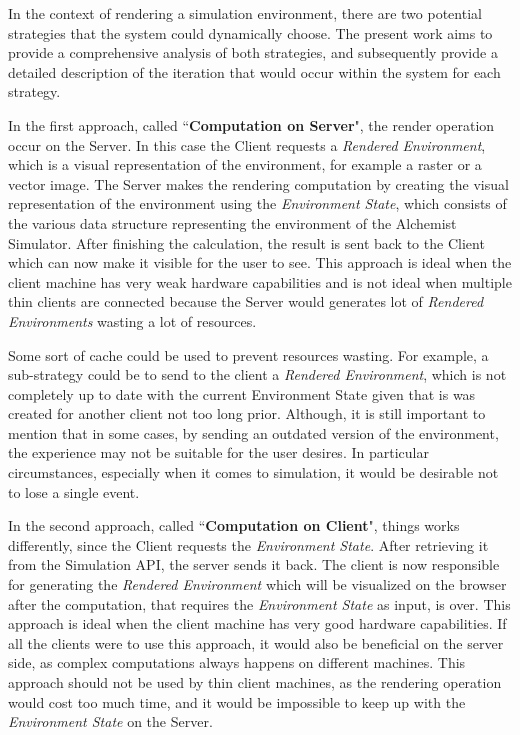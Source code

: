 In the context of rendering a simulation environment, there are two potential strategies that the system could dynamically choose. The present work aims to provide a comprehensive analysis of both strategies, and subsequently provide a detailed description of the iteration that would occur within the system for each strategy.\newline


In the first approach, called ``\textbf{Computation on Server}", the render operation occur on the Server. In this case the Client requests a \textit{Rendered Environment}, which is a visual representation of the environment, for example a raster or a vector image. The Server makes the rendering computation by creating the visual representation of the environment using the \textit{Environment State}, which consists of the various data structure representing the environment of the Alchemist Simulator.
After finishing the calculation, the result is sent back to the Client which can now make it visible for the user to see. This approach is ideal when the client machine has very weak hardware capabilities and is not ideal when multiple thin clients are connected because the Server would generates lot of \textit{Rendered Environments} wasting a lot of resources.

\begin{warn}[Note:]
	Some sort of cache could be used to prevent resources wasting.
	For example, a sub-strategy could be to send to the client a \textit{Rendered Environment}, which is not completely up to date with the current Environment State given that is was created for another client not too long prior. Although, it is still important to mention that in some cases, by sending an outdated version of the environment, the experience may not be suitable for the user desires. In particular circumstances, especially when it comes to simulation, it would be desirable not to lose a single event.
\end{warn}


In the second approach, called ``\textbf{Computation on Client}", things works differently, since the Client requests the \textit{Environment State}. After retrieving it from the Simulation API, the server sends it back. The client is now responsible for generating the \textit{Rendered Environment} which will be visualized on the browser after the computation, that requires the \textit{Environment State} as input, is over. This approach is ideal when the client machine has very good hardware capabilities. If all the clients were to use this approach, it would also be beneficial on the server side, as complex computations always happens on different machines. This approach should not be used by thin client machines, as the rendering operation would cost too much time, and it would be impossible to keep up with the \textit{Environment State} on the Server.

